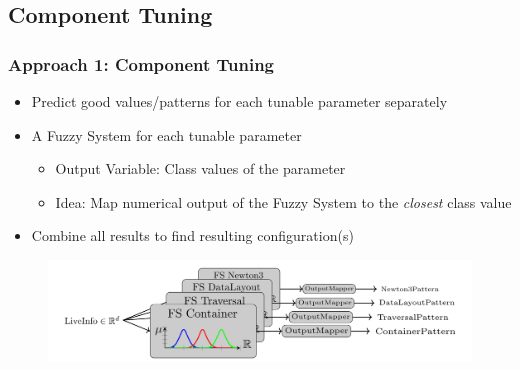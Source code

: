 \documentclass[
	10pt,
	t		%
]{beamer}
\begin{document}
\subsection{Component Tuning}
\begin{frame}
	\frametitle{Approach 1: Component Tuning}
	\begin{itemize}
		\item Predict good values/patterns for each tunable parameter separately
		\item A Fuzzy System for each tunable parameter
		      \begin{itemize}
			      \item Output Variable: Class values of the parameter
			      \item Idea: Map numerical output of the Fuzzy System to the \textit{closest} class value {\footnotesize \cite{Mohammed2022}}
		      \end{itemize}
		\item Combine all results to find resulting configuration(s)
	\end{itemize}

	\begin{figure}
		\centering
		\includegraphics[width=1\textwidth]{figures/component-approach.png}
	\end{figure}

\end{frame}
\end{document}
